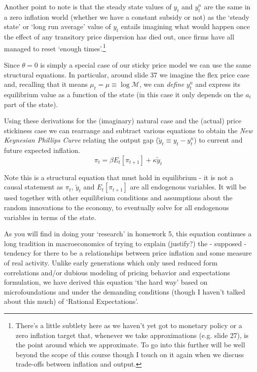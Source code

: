 \documentclass[authoryear,11pt]{elsarticle}
\begin{document}
Another point to note is that the steady state values of $y_{t}$ and $y_{t}^{n}$ are the same in a zero inflation world (whether we have a constant subsidy or not) as the `steady state' or `long run average' value of $y_{t}$ entails imagining what would happen once the effect of any transitory price dispersion has died out, once firms have all managed to reset `enough times'.\footnote{There's a little subtlety here as we haven't yet got to monetary policy or a zero inflation target that, whenever we take approximations (e.g. slide 27), is the point around which we approximate. To go into this further will be well beyond the scope of this course though I touch on it again when we discuss trade-offs between inflation and output.}

Since $\theta=0$ is simply a special case of our sticky price model we can use the same structural equations. In particular, around slide 37 we imagine the flex price case and, recalling that it means $\mu_{t} = \mu \equiv \log \mathcal{M}$, we can \textit{define} $y_{t}^{n}$ and express its equilibrium value as a function of the state (in this case it only depends on the $a_{t}$ part of the state).

Using these derivations for the (imaginary) natural case and the (actual) price stickiness case we can rearrange and subtract various equations to obtain the \textit{New Keynesian Phillips Curve} relating the output gap ($\tilde{y}_{t}\equiv y_{t}-y_{t}^{n}$) to current and future expected inflation.
\begin{equation}
\pi_{t} = \beta E_{t}[ \pi_{t+1} ] + \kappa \tilde{y}_{t}
\end{equation}

Note this is a structural equation that must hold in equilibrium - it is not a causal statement as $\pi_{t}$, $\tilde{y}_{t}$ and $E_{t}[\pi_{t+1}]$ are all endogenous variables. It will be used together with other equilibrium conditions and assumptions about the random innovations to the economy, to eventually solve for all endogenous variables in terms of the state.

As you will find in doing your `research' in homework 5, this equation continues a long tradition in macroeconomics of trying to explain (justify?) the - supposed - tendency for there to be a relationships between price inflation and some measure of real activity. Unlike early generations which only used reduced form correlations and/or dubious modeling of pricing behavior and expectations formulation, we have derived this equation `the hard way' based on microfoundations and under the demanding conditions (though I haven't talked about this much) of `Rational Expectations'.
\end{document}
